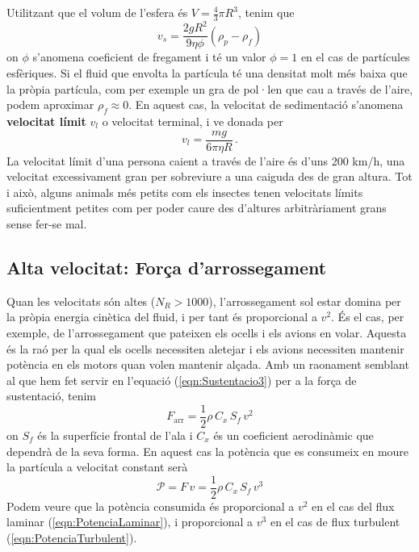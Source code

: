 \documentclass[12pt]{book}
\begin{document}
%
Utilitzant que el volum de l'esfera és $V = \frac43 \pi R^3$, tenim que
%
\begin{equation}
    \boxed{v_s = \frac{2gR^2}{9\eta\phi} (\rho_p - \rho_f)}
\end{equation}
%
on $\phi$ s'anomena coeficient de fregament i té un valor $\phi = 1$ en el cas de partícules esfèriques. Si el fluid que envolta la partícula té una densitat molt més baixa que la pròpia partícula, com per exemple un gra de pol·len que cau a través de l'aire, podem aproximar $\rho_f \approx 0$. En aquest cas, la velocitat de sedimentació s'anomena {\bf velocitat límit} $v_l$ o velocitat terminal, i ve donada per
%
\begin{equation}
    v_l = \frac{m g}{6 \pi \eta R}\, .
\end{equation}
%
La velocitat límit d'una persona caient a través de l'aire és d'uns 200 km/h, una velocitat excessivament gran per sobreviure a una caiguda des de gran altura. Tot i això, alguns animals més petits com els insectes tenen velocitats límits suficientment petites com per poder caure des d'altures arbitràriament grans sense fer-se mal.

\subsection{Alta velocitat: Força d’arrossegament}

Quan les velocitats són altes ($N_R > 1000$), l'arrossegament sol estar domina per la pròpia energia cinètica del fluid, i per tant és proporcional a $v^2$. És el cas, per exemple, de l'arrossegament que pateixen els ocells i els avions en volar. Aquesta és la raó per la qual els ocells necessiten aletejar i els avions necessiten mantenir potència en els motors quan volen mantenir alçada. Amb un raonament semblant al que hem fet servir en l'equació (\ref{eqn:Sustentacio3}) per a la força de sustentació, tenim
%
\begin{equation}
    \boxed{F_\text{arr} = \frac12 \rho \, C_x \,  S_f \, v^2 }
    \label{eqn:Sustentacio3}
\end{equation}
%
on $S_f$ és la superfície frontal de l'ala i $C_x$ és un coeficient aerodinàmic que dependrà de la seva forma. En aquest cas la potència que es consumeix en moure la partícula a velocitat constant serà
%
\begin{equation}
    \boxed{\mathcal{P} = F \, v = \frac12 \rho \, C_x \,  S_f \, v^3 }
    \label{eqn:PotenciaTurbulent}
\end{equation}
%
Podem veure que la potència consumida és proporcional a $v^2$ en el cas del flux laminar (\ref{eqn:PotenciaLaminar}), i proporcional a $v^3$ en el cas de flux turbulent (\ref{eqn:PotenciaTurbulent}).
\end{document}
